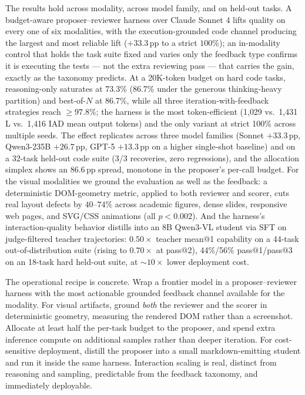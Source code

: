 The results hold across modality, across model family, and on held-out tasks. A budget-aware proposer--reviewer harness over Claude Sonnet 4 lifts quality on every one of six modalities, with the execution-grounded code channel producing the largest and most reliable lift ($+33.3$\,pp to a strict $100\%$); an in-modality control that holds the task suite fixed and varies only the feedback type confirms it is executing the tests --- not the extra reviewing pass --- that carries the gain, exactly as the taxonomy predicts. At a 20K-token budget on hard code tasks, reasoning-only saturates at 73.3\% (86.7\% under the generous thinking-heavy partition) and best-of-$N$ at 86.7\%, while all three iteration-with-feedback strategies reach $\geq 97.8\%$; the harness is the most token-efficient (1{,}029 vs.\ 1{,}431 L vs.\ 1{,}416 IAD mean output tokens) and the only variant at strict 100\% across multiple seeds. The effect replicates across three model families (Sonnet $+33.3$\,pp, Qwen3-235B $+26.7$\,pp, GPT-5 $+13.3$\,pp on a higher single-shot baseline) and on a 32-task held-out code suite (3/3 recoveries, zero regressions), and the allocation simplex shows an 86.6\,pp spread, monotone in the proposer's per-call budget. For the visual modalities we ground the evaluation as well as the feedback: a deterministic DOM-geometry metric, applied to both reviewer and scorer, cuts real layout defects by $40$--$74\%$ across academic figures, dense slides, responsive web pages, and SVG/CSS animations (all $p<0.002$). And the harness's interaction-quality behavior distills into an 8B Qwen3-VL student via SFT on judge-filtered teacher trajectories: $0.50\times$ teacher mean@1 capability on a 44-task out-of-distribution suite (rising to $0.70\times$ at pass@2), 44\%/56\% pass@1/pass@3 on an 18-task hard held-out suite, at $\sim 10\times$ lower deployment cost.

The operational recipe is concrete. Wrap a frontier model in a proposer--reviewer harness with the most actionable grounded feedback channel available for the modality. For visual artifacts, ground \emph{both} the reviewer and the scorer in deterministic geometry, measuring the rendered DOM rather than a screenshot. Allocate at least half the per-task budget to the proposer, and spend extra inference compute on additional samples rather than deeper iteration. For cost-sensitive deployment, distill the proposer into a small markdown-emitting student and run it inside the same harness. Interaction scaling is real, distinct from reasoning and sampling, predictable from the feedback taxonomy, and immediately deployable.
